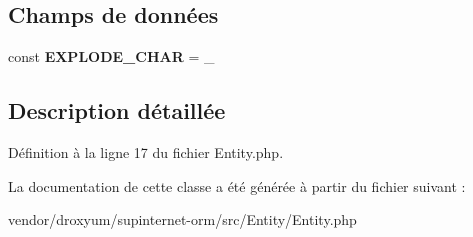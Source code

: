 \subsection*{Champs de données}
\begin{DoxyCompactItemize}
\item 
const {\bfseries E\+X\+P\+L\+O\+D\+E\+\_\+\+C\+H\+AR} = \textquotesingle{}\+\_\+\textquotesingle{}\hypertarget{class_o_r_m_1_1_entity_1_1_entity_accef127ca630c6457d197d693c586b7e}{}\label{class_o_r_m_1_1_entity_1_1_entity_accef127ca630c6457d197d693c586b7e}

\end{DoxyCompactItemize}


\subsection{Description détaillée}


Définition à la ligne 17 du fichier Entity.\+php.



La documentation de cette classe a été générée à partir du fichier suivant \+:\begin{DoxyCompactItemize}
\item 
vendor/droxyum/supinternet-\/orm/src/\+Entity/Entity.\+php\end{DoxyCompactItemize}
